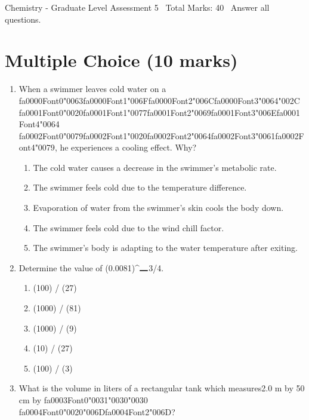 \documentclass[12pt]{article}
\begin{document}
\begin{center}
Chemistry - Graduate Level Assessment 5 \
Total Marks: 40 \
Answer all questions.
\end{center}

\section*{Multiple Choice (10 marks)}
\begin{enumerate}[label=\arabic*.]
\item When a swimmer leaves cold water on a {\csname fa0000Font0\endcsname\char"0063}{\csname fa0000Font1\endcsname\char"006F}{\csname fa0000Font2\endcsname\char"006C}{\csname fa0000Font3\endcsname\char"0064}{\char"002C} {\csname fa0001Font0\endcsname\char"0020}{\csname fa0001Font1\endcsname\char"0077}{\csname fa0001Font2\endcsname\char"0069}{\csname fa0001Font3\endcsname\char"006E}{\csname fa0001Font4\endcsname\char"0064} {\csname fa0002Font0\endcsname\char"0079}{\csname fa0002Font1\endcsname\char"0020}{\csname fa0002Font2\endcsname\char"0064}{\csname fa0002Font3\endcsname\char"0061}{\csname fa0002Font4\endcsname\char"0079}, he experiences a cooling effect.
Why?
\begin{enumerate}[label=(\alph*)]
    \item The cold water causes a decrease in the swimmer's metabolic rate.
    \item The swimmer feels cold due to the temperature difference.
    \item Evaporation of water from the swimmer's skin cools the body down.
    \item The swimmer feels cold due to the wind chill factor.
    \item The swimmer's body is adapting to the water temperature after exiting.
\end{enumerate}
\item Determine the value of (0.0081)\^{}\ensuremath{\rule{1em}{1pt}}3/4.
\begin{enumerate}[label=(\alph*)]
    \item (100) / (27)
    \item (1000) / (81)
    \item (1000) / (9)
    \item (10) / (27)
    \item (100) / (3)
\end{enumerate}
\item What is the volume in liters of a rectangular tank which measures2.0 m by 50 cm by {\csname fa0003Font0\endcsname\char"0031}{\char"0030}{\char"0030} {\csname fa0004Font0\endcsname\char"0020}{\char"006D}{\csname fa0004Font2\endcsname\char"006D}?

\end{enumerate}
\end{document}
